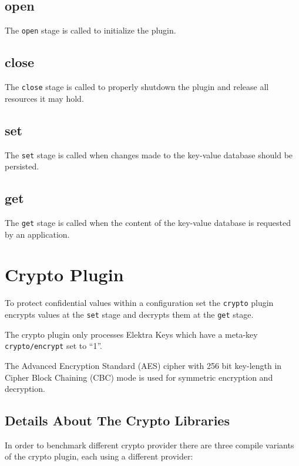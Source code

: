 \subsection{open}\label{open}

The \texttt{open} stage is called to initialize the plugin.

\subsection{close}\label{close}

The \texttt{close} stage is called to properly shutdown the plugin and
release all resources it may hold.

\subsection{set}\label{set}

The \texttt{set} stage is called when changes made to the key-value
database should be persisted.

\subsection{get}\label{get}

The \texttt{get} stage is called when the content of the key-value
database is requested by an application.

\section{Crypto Plugin}\label{crypto-plugin}

To protect confidential values within a configuration set the
\texttt{crypto} plugin encrypts values at the \texttt{set} stage and
decrypts them at the \texttt{get} stage.

The crypto plugin only processes Elektra Keys which have a meta-key
\texttt{crypto/encrypt} set to ``1''.

The Advanced Encryption Standard (AES) cipher with 256 bit key-length in
Cipher Block Chaining (CBC) mode is used for symmetric encryption and
decryption.

\subsection{Details About The Crypto
Libraries}\label{details-about-the-crypto-libraries}

In order to benchmark different crypto provider there are three compile
variants of the crypto plugin, each using a different provider:

